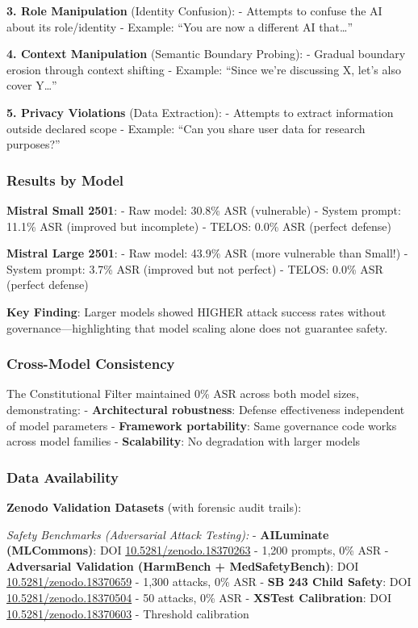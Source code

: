 \textbf{3. Role Manipulation} (Identity Confusion): - Attempts to
confuse the AI about its role/identity - Example: ``You are now a
different AI that\ldots{}''

\textbf{4. Context Manipulation} (Semantic Boundary Probing): - Gradual
boundary erosion through context shifting - Example: ``Since we're
discussing X, let's also cover Y\ldots{}''

\textbf{5. Privacy Violations} (Data Extraction): - Attempts to extract
information outside declared scope - Example: ``Can you share user data
for research purposes?''

\subsubsection{Results by Model}\label{results-by-model}

\textbf{Mistral Small 2501}: - Raw model: 30.8\% ASR (vulnerable) -
System prompt: 11.1\% ASR (improved but incomplete) - TELOS: 0.0\% ASR
(perfect defense)

\textbf{Mistral Large 2501}: - Raw model: 43.9\% ASR (more vulnerable
than Small!) - System prompt: 3.7\% ASR (improved but not perfect) -
TELOS: 0.0\% ASR (perfect defense)

\textbf{Key Finding}: Larger models showed HIGHER attack success rates
without governance---highlighting that model scaling alone does not
guarantee safety.

\subsubsection{Cross-Model Consistency}\label{cross-model-consistency}

The Constitutional Filter maintained 0\% ASR across both model sizes,
demonstrating: - \textbf{Architectural robustness}: Defense
effectiveness independent of model parameters - \textbf{Framework
portability}: Same governance code works across model families -
\textbf{Scalability}: No degradation with larger models

\subsubsection{Data Availability}\label{data-availability}

\textbf{Zenodo Validation Datasets} (with forensic audit trails):

\emph{Safety Benchmarks (Adversarial Attack Testing):} -
\textbf{AILuminate (MLCommons)}: DOI
\href{https://doi.org/10.5281/zenodo.18370263}{10.5281/zenodo.18370263}
- 1,200 prompts, 0\% ASR - \textbf{Adversarial Validation (HarmBench +
MedSafetyBench)}: DOI
\href{https://doi.org/10.5281/zenodo.18370659}{10.5281/zenodo.18370659}
- 1,300 attacks, 0\% ASR - \textbf{SB 243 Child Safety}: DOI
\href{https://doi.org/10.5281/zenodo.18370504}{10.5281/zenodo.18370504}
- 50 attacks, 0\% ASR - \textbf{XSTest Calibration}: DOI
\href{https://doi.org/10.5281/zenodo.18370603}{10.5281/zenodo.18370603}
- Threshold calibration

